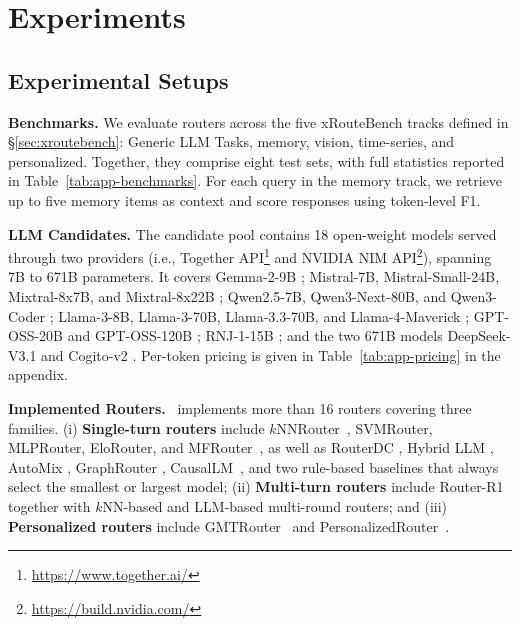 

\section{Experiments} \label{sec:exp}
\subsection{Experimental Setups}
\noindent\textbf{Benchmarks.}
We evaluate routers across the five xRouteBench tracks defined in \S\ref{sec:xroutebench}: Generic LLM Tasks, memory, vision, time-series, and personalized. Together, they comprise eight test sets, with full statistics reported in Table~\ref{tab:app-benchmarks}. For each query in the memory track, we retrieve up to five memory items as context and score responses using token-level F1.

\noindent\textbf{LLM Candidates.}
The candidate pool contains 18 open-weight models served through two providers (i.e., Together API\footnote{\url{https://www.together.ai/}} and NVIDIA NIM API\footnote{\url{https://build.nvidia.com/}}), spanning 7B to 671B parameters. It covers Gemma-2-9B \citep{team2024gemma}; Mistral-7B, Mistral-Small-24B, Mixtral-8x7B, and Mixtral-8x22B \citep{jiang2023mistral, jiang2024mixtral}; Qwen2.5-7B, Qwen3-Next-80B, and Qwen3-Coder \citep{yang2024qwen2, yang2025qwen3}; Llama-3-8B, Llama-3-70B, Llama-3.3-70B, and Llama-4-Maverick \citep{grattafiori2024llama, adcock2026llama}; GPT-OSS-20B and GPT-OSS-120B \citep{agarwal2025gpt}; RNJ-1-15B \citep{rnj1_5_instruct}; and the two 671B models DeepSeek-V3.1 \citep{liu2024deepseek} and Cogito-v2 \citep{deepcogito2025cogitov2_671b}. Per-token pricing is given in Table~\ref{tab:app-pricing} in the appendix.

\noindent\textbf{Implemented Routers.}
\method\ implements more than 16 routers covering three families. (i) \textbf{Single-turn routers} include $k$NNRouter~\citep{li2025rethinking}, SVMRouter, MLPRouter, EloRouter, and MFRouter~\citep{ong2024routellm, shnitzer2023large}, as well as RouterDC \citep{chen2024routerdc}, Hybrid LLM \citep{ding2024hybrid}, AutoMix \citep{aggarwal2024automix}, GraphRouter \citep{feng2024graphrouter}, CausalLM~\citep{ong2024routellm}, and two rule-based baselines that always select the smallest or largest model; (ii) \textbf{Multi-turn routers} include Router-R1 \citep{zhang2025router} together with $k$NN-based and LLM-based multi-round routers; and (iii) \textbf{Personalized routers} include GMTRouter~\citep{xie2025gmtrouter} and PersonalizedRouter~\citep{dai2025personalizedrouter}.

